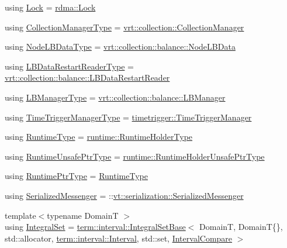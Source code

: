 \begin{DoxyCompactItemize}
\item 
using \hyperlink{namespacevt_ae3eb725d1ffe20cd7d82a8c42f3e52ef}{Lock} = \hyperlink{namespacevt_1_1rdma_ac5c20b41a653e520b6305d4d454ecb70}{rdma\+::\+Lock}
\item 
using \hyperlink{namespacevt_a290f7e8941f9f411b54cdb15b6cea107}{Collection\+Manager\+Type} = \hyperlink{structvt_1_1vrt_1_1collection_1_1_collection_manager}{vrt\+::collection\+::\+Collection\+Manager}
\item 
using \hyperlink{namespacevt_a19cb20485baa09ecc30086fbc62fd6ef}{Node\+L\+B\+Data\+Type} = \hyperlink{structvt_1_1vrt_1_1collection_1_1balance_1_1_node_l_b_data}{vrt\+::collection\+::balance\+::\+Node\+L\+B\+Data}
\item 
using \hyperlink{namespacevt_afa4cbc17d753afab37e21dd902f68e9e}{L\+B\+Data\+Restart\+Reader\+Type} = \hyperlink{structvt_1_1vrt_1_1collection_1_1balance_1_1_l_b_data_restart_reader}{vrt\+::collection\+::balance\+::\+L\+B\+Data\+Restart\+Reader}
\item 
using \hyperlink{namespacevt_a1ae0212259259772d2e857f497714e1b}{L\+B\+Manager\+Type} = \hyperlink{structvt_1_1vrt_1_1collection_1_1balance_1_1_l_b_manager}{vrt\+::collection\+::balance\+::\+L\+B\+Manager}
\item 
using \hyperlink{namespacevt_ab6a0fefc7e53fbe4eaec0fef22ae15e3}{Time\+Trigger\+Manager\+Type} = \hyperlink{structvt_1_1timetrigger_1_1_time_trigger_manager}{timetrigger\+::\+Time\+Trigger\+Manager}
\item 
using \hyperlink{namespacevt_a5c1db2c048b259a2ba8961766ddb9278}{Runtime\+Type} = \hyperlink{namespacevt_1_1runtime_ab09d044cce417fbcdb7e1e29b7aabbc3}{runtime\+::\+Runtime\+Holder\+Type}
\item 
using \hyperlink{namespacevt_a8019b70cc4b9b0833c38559c85dfd53b}{Runtime\+Unsafe\+Ptr\+Type} = \hyperlink{namespacevt_1_1runtime_a69931905b04961a874e4a70a43083a83}{runtime\+::\+Runtime\+Holder\+Unsafe\+Ptr\+Type}
\item 
using \hyperlink{namespacevt_a0ce60e0299d8fa32223b3b9ffa0af466}{Runtime\+Ptr\+Type} = \hyperlink{namespacevt_a5c1db2c048b259a2ba8961766ddb9278}{Runtime\+Type}
\item 
using \hyperlink{namespacevt_a490b7af99bdeb06e988d94a7ab389b43}{Serialized\+Messenger} = \+::\hyperlink{structvt_1_1serialization_1_1_serialized_messenger}{vt\+::serialization\+::\+Serialized\+Messenger}
\item 
{\footnotesize template$<$typename DomainT $>$ }\\using \hyperlink{namespacevt_af8fc7210a3d8e598330cf3375857ef1e}{Integral\+Set} = \hyperlink{structvt_1_1term_1_1interval_1_1_integral_set_base}{term\+::interval\+::\+Integral\+Set\+Base}$<$ DomainT, DomainT\{\}, std\+::allocator, \hyperlink{structvt_1_1term_1_1interval_1_1_interval}{term\+::interval\+::\+Interval}, std\+::set, \hyperlink{namespacevt_ab51b754f1d22841f555246195fab9d41}{Interval\+Compare} $>$

\end{DoxyCompactItemize}
